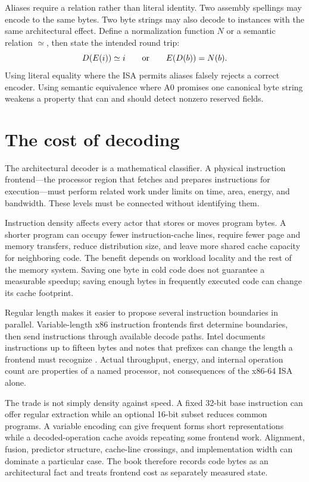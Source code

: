 Aliases require a relation rather than literal identity. Two assembly
spellings may encode to the same bytes. Two byte strings may also decode to
instances with the same architectural effect. Define a normalization function
\(N\) or a semantic relation \(\simeq\), then state the intended round trip:
\[
  D(E(i))\simeq i
  \qquad\hbox{or}\qquad
  E(D(b))=N(b).
\]
Using literal equality where the ISA permits aliases falsely rejects a correct
encoder. Using semantic equivalence where A0 promises one canonical byte
string weakens a property that can and should detect nonzero reserved fields.

\section{The cost of decoding}

The architectural decoder is a mathematical classifier. A physical
instruction frontend---the processor region that fetches and prepares
instructions for execution---must perform related work under limits on time,
area, energy, and bandwidth.
These levels must be connected without identifying them.

Instruction density affects every actor that stores or moves program bytes. A
shorter program can occupy fewer instruction-cache lines, require fewer page
and memory transfers, reduce distribution size, and leave more shared cache
capacity for neighboring code. The benefit depends on workload locality and
the rest of the memory system. Saving one byte in cold code does not guarantee
a measurable speedup; saving enough bytes in frequently executed code can change its cache
footprint.

Regular length makes it easier to propose several instruction boundaries in
parallel. Variable-length x86 instruction frontends first determine boundaries, then send
instructions through available decode paths. Intel documents instructions up
to fifteen bytes and notes that prefixes can change the length a frontend must
recognize \autocite{intel2026optimization}. Actual throughput, energy, and
internal operation count are properties of a named processor, not consequences
of the x86-64 ISA alone.

The trade is not simply density against speed. A fixed 32-bit base instruction
can offer regular extraction while an optional 16-bit subset reduces common
programs. A variable encoding can give frequent forms short representations
while a decoded-operation cache avoids repeating some frontend work. Alignment,
fusion, predictor structure, cache-line crossings, and implementation width
can dominate a particular case. The book therefore records code bytes as an
architectural fact and treats frontend cost as separately measured state.

